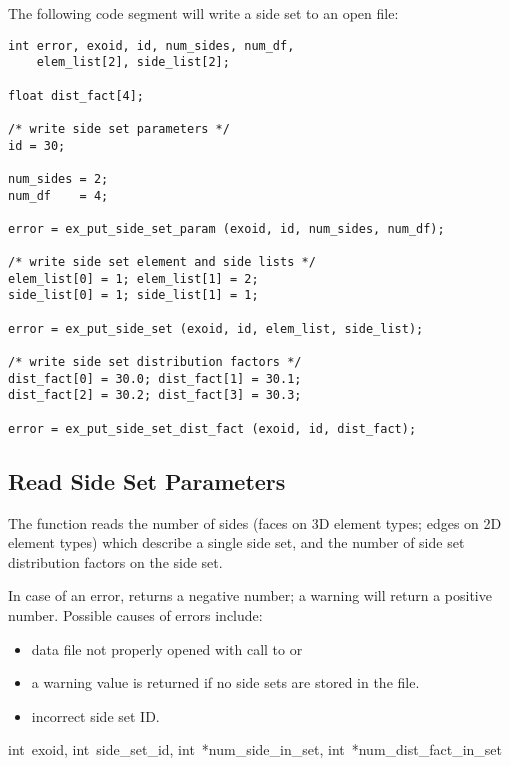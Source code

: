 The following code segment will write a side set to an open 
\exo{} file:

\begin{lstlisting}
int error, exoid, id, num_sides, num_df, 
    elem_list[2], side_list[2];

float dist_fact[4];

/* write side set parameters */
id = 30;

num_sides = 2;
num_df    = 4;

error = ex_put_side_set_param (exoid, id, num_sides, num_df);

/* write side set element and side lists */
elem_list[0] = 1; elem_list[1] = 2;
side_list[0] = 1; side_list[1] = 1;

error = ex_put_side_set (exoid, id, elem_list, side_list);

/* write side set distribution factors */
dist_fact[0] = 30.0; dist_fact[1] = 30.1;
dist_fact[2] = 30.2; dist_fact[3] = 30.3;

error = ex_put_side_set_dist_fact (exoid, id, dist_fact);
\end{lstlisting}



\subsection{Read Side Set Parameters}

The function  reads the number of
sides (faces on 3D element types; edges on 2D element types) which
describe a single side set, and the number of side set distribution
factors on the side set.

In case of an error,  returns a
negative number; a warning will return a positive number. Possible
causes of errors include:

\begin{itemize}
 \item data file not properly opened with call to 
 or 

 \item a warning value is returned if no side sets are stored 
in the file.

 \item incorrect side set ID.
\end{itemize}

{int~exoid, 
int~side_set_id, 
int~*num_side_in_set, 
int~*num_dist_fact_in_set}

